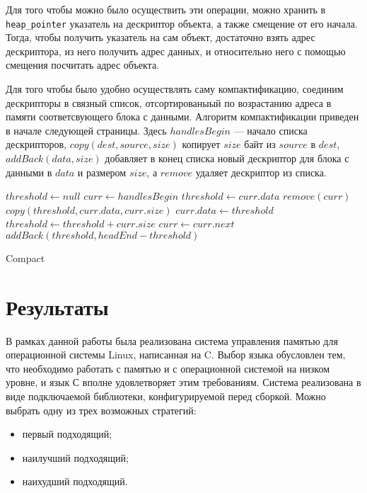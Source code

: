 Для того чтобы можно было осуществить эти операции, можно хранить в \lstinline{heap_pointer}
указатель на дескриптор объекта, а также смещение от его начала. Тогда, чтобы получить
указатель на сам объект, достаточно взять адрес дескриптора, из него 
получить адрес данных, и относительно него с помощью смещения посчитать адрес объекта. 

Для того чтобы было удобно осуществлять саму компактификацию, соединим дескрипторы в связный список, отсортированыый по возрастанию адреса в памяти
соответсвующего блока с данными. Алгоритм компактификации приведен в начале следующей страницы. Здесь $handlesBegin$ --- начало списка дескрипторов, $copy(dest, source, size)$ копирует
$size$ байт из $source$ в $dest$, $addBack(data, size)$ добавляет в конец списка
новый дескриптор для блока с данными в $data$ и размером $size$, а $remove$ удаляет
дескриптор из списка.


\begin{algorithm}
\begin{algorithmic}[1]
\State $threshold\gets null$
\State $curr\gets handlesBegin$
			\State $threshold\gets curr.data$		
		\EndIf
		\State $remove(curr)$		
			\State $copy(threshold, curr.data, curr.size)$
			\State $curr.data\gets threshold$
			\State $threshold\gets threshold + curr.size$
		\EndIf
	\State $curr\gets curr.next$
\EndWhile
\State $addBack(threshold, headEnd - threshold)$
\end{algorithmic}
\caption{Compact}
\end{algorithm}


\section{Результаты}

В рамках данной работы была реализована система управления памятью для операционной 
системы Linux, написанная на C. Выбор языка обусловлен тем, что необходимо работать с памятью и 
с операционной системой на низком уровне, и язык С вполне удовлетворяет этим требованиям.
Система реализована в виде подключаемой библиотеки,
конфигурируемой перед сборкой. Можно выбрать одну из трех возможных стратегий:

\begin{itemize}
\item первый подходящий;
\item наилучший подходящий;
\item наихудший подходящий.
\end{itemize}

